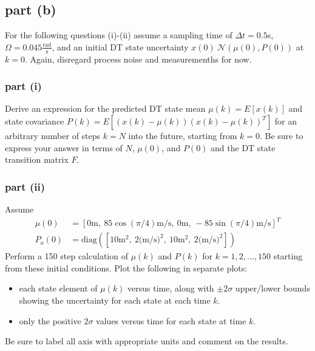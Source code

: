 \documentclass[11pt]{article}
\begin{document}
\subsection*{part (b)}
For the following questions (i)-(ii) assume a sampling time of $\Delta t=0.5$s, $\Omega=0.045\frac{\text{rad}}{\text{s}}$, and an initial DT state uncertainty $x(0)~\mathcal{N}(\mu(0),P(0))$ at $k=0$. Again, disregard process noise and measuremenths for now.

\subsubsection*{part (i)}
Derive an expression for the predicted DT state mean $\mu(k)=E[x(k)]$ and state covariance $P(k)=E[(x(k)-\mu(k))(x(k)-\mu(k))^T]$ for an arbitrary number of steps $k=N$ into the future, starting from $k=0$. Be sure to express your answer in terms of $N$, $\mu(0)$, and $P(0)$ and the DT state transition matrix $F$.

\subsubsection*{part (ii)}
Assume
\begin{align*}
	\mu(0) &= [0\text{m},\ 85\cos(\pi/4)\text{m/s},\ 0\text{m},\ -85\sin(\pi/4)\text{m/s}]^T \\
	P_a(0) &= \text{diag}([10\text{m}^2,\ 2\text{(m/s)}^2,\ 10\text{m}^2,\ 2\text{(m/s)}^2])
\end{align*}
Perform a 150 step calculation of $\mu(k)$ and $P(k)$ for $k=1,2,\dots,150$ starting from these initial conditions. Plot the following in separate plots:
\begin{itemize}
	\item each state element of $\mu(k)$ versus time, along with $\pm2\sigma$ upper/lower bounds showing the uncertainty for each state at each time $k$.
	\item only the positive $2\sigma$ values versus time for each state at time $k$.
\end{itemize}
Be sure to label all axis with appropriate units and comment on the results.
\end{document}
